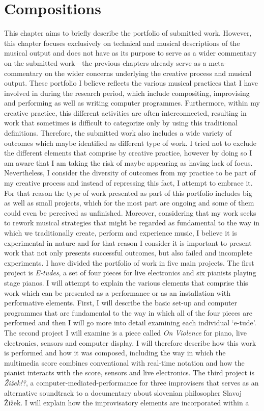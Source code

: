 \hypertarget{chapter7}{}
\chapter{Compositions}

This chapter aims to briefly describe the portfolio of submitted work. However, this chapter focuses exclusively on technical and musical descriptions of the musical output and does not have as its purpose to serve as a wider commentary on the submitted work---the previous chapters already serve as a meta-commentary on the wider concerns underlying the creative process and musical output. These portfolio I believe reflects the various musical practices that I have involved in during the research period, which include compositing, improvising and performing as well as writing computer programmes. Furthermore, within my creative practice, this different activities are often interconnected, resulting in work that sometimes is difficult to categorize only by using this traditional definitions. Therefore, the submitted work also includes a wide variety of outcomes which maybe identified as different type of work. I tried not to exclude the different elements that comprise by creative practice, however by doing so I am aware that I am taking the risk of maybe appearing as having lack of focus. Nevertheless, I consider the diversity of outcomes from my practice to be part of my creative process and instead of repressing this fact, I attempt to embrace it. For that reason the type of work presented as part of this portfolio includes big as well as small projects, which for the most part are ongoing and some of them could even be perceived as unfinished. Moreover, considering that my work seeks to rework musical strategies that might be regarded as fundamental to the way in which we traditionally create, perform and experience music, I believe it is experimental in nature and for that reason I consider it is important to present work that not only presents successful outcomes, but also failed and incomplete experiments. I have divided the portfolio of work in five main projects. The first project is \emph{E-tudes}, a set of four pieces for live electronics and six pianists playing stage pianos. I will attempt to explain the various elements that comprise this work which can be presented as a performance or as an installation with performative elements. First, I will describe the basic set-up and computer programmes that are fundamental to the way in which all of the four pieces are performed and then I will go more into detail examining each individual `e-tude'. The second project I will examine is a piece called \emph{On Violence} for piano, live electronics, sensors and computer display. I will therefore describe how this work is performed and how it was composed, including the way in which the multimedia score combines conventional with real-time notation and how the pianist interacts with the score, sensors and live electronics. The third project is \emph{\v{Z}i\v{z}ek!?}, a computer-mediated-performance for three improvisers that serves as an alternative soundtrack to a documentary about slovenian philosopher Slavoj \v{Z}i\v{z}ek. I will explain how the improvisatory elements are incorporated within a 